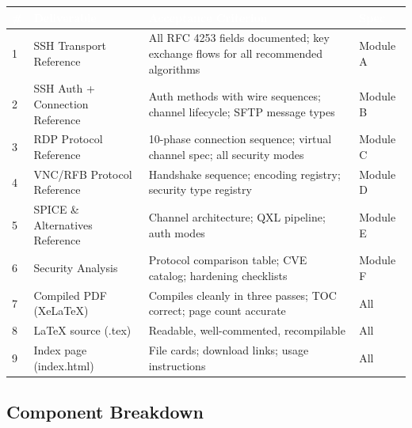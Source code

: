 \documentclass[11pt,letterpaper]{article}
\newcommand{\tableheader}[1]{\textbf{\sffamily\textcolor{white}{#1}}}
\begin{document}
\begin{center}
\begin{tabularx}{\textwidth}{C{0.5cm}L{4cm}X L{3cm}}
\toprule
{}
\tableheader{\#} & \tableheader{Deliverable} & \tableheader{Acceptance Criterion} & \tableheader{Spec} \\
 & SSH Transport Reference & All RFC 4253 fields documented; key exchange flows for all recommended algorithms & Module A \\
2 & SSH Auth + Connection Reference & Auth methods with wire sequences; channel lifecycle; SFTP message types & Module B \\
3 & RDP Protocol Reference & 10-phase connection sequence; virtual channel spec; all security modes & Module C \\
4 & VNC/RFB Protocol Reference & Handshake sequence; encoding registry; security type registry & Module D \\
5 & SPICE \& Alternatives Reference & Channel architecture; QXL pipeline; auth modes & Module E \\
6 & Security Analysis & Protocol comparison table; CVE catalog; hardening checklists & Module F \\
7 & Compiled PDF (XeLaTeX) & Compiles cleanly in three passes; TOC correct; page count accurate & All \\
8 & LaTeX source (.tex) & Readable, well-commented, recompilable & All \\
9 & Index page (index.html) & File cards; download links; usage instructions & All \\
\bottomrule
\end{tabularx}
\end{center}

\subsection{Component Breakdown}
\end{document}
